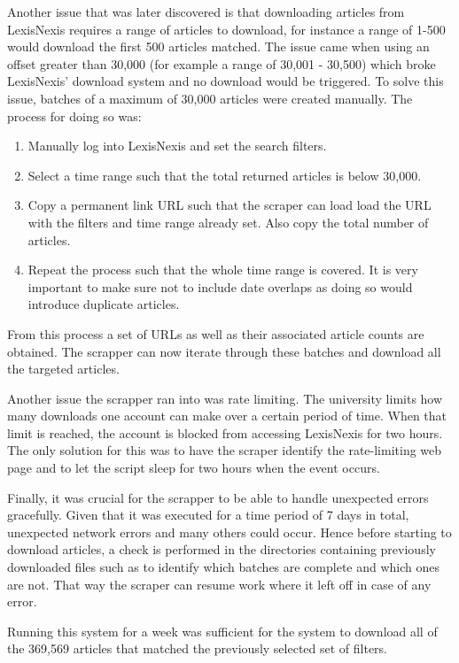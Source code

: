 Another issue that was later discovered is that downloading articles from LexisNexis requires a range of articles to download, for instance a range of 1-500 would download the first 500 articles matched. The issue came when using an offset greater than 30,000 (for example a range of 30,001 - 30,500) which broke LexisNexis' download system and no download would be triggered. To solve this issue, batches of a maximum of 30,000 articles were created manually. The process for doing so was:
\begin{enumerate}
    \item Manually log into LexisNexis and set the search filters.
    \item Select a time range such that the total returned articles is below 30,000.
    \item Copy a permanent link URL such that the scraper can load load the URL with the filters and time range already set. Also copy the total number of articles.
    \item Repeat the process such that the whole time range is covered. It is very important to make sure not to include date overlaps as doing so would introduce duplicate articles.
\end{enumerate}

From this process a set of URLs as well as their associated article counts are obtained. The scrapper can now iterate through these batches and download all the targeted articles.

Another issue the scrapper ran into was rate limiting. The university limits how many downloads one account can make over a certain period of time. When that limit is reached, the account is blocked from accessing LexisNexis for two hours. The only solution for this was to have the scraper identify the rate-limiting web page and to let the script sleep for two hours when the event occurs.

Finally, it was crucial for the scrapper to be able to handle unexpected errors gracefully. Given that it was executed for a time period of 7 days in total, unexpected network errors and many others could occur. Hence before starting to download articles, a check is performed in the directories containing previously downloaded files such as to identify which batches are complete and which ones are not. That way the scraper can resume work where it left off in case of any error.

Running this system for a week was sufficient for the system to download all of the 369,569 articles that matched the previously selected set of filters.

